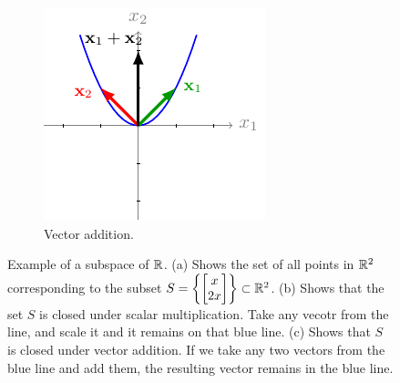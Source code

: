 \begin{figure}[h]
\begin{subfigure}[b]{0.32\textwidth}
    \end{subfigure}
    \begin{subfigure}[b]{0.32\textwidth}
        \centering
        \includegraphics{figure/chapter01/nosubspace2(c).pdf}
        \caption{Vector addition.}
        \label{fig:nosubspace2-addition}
    \end{subfigure}
    \caption{Example of a subspace of $\mathbb{R}$. (a) Shows the set of all points in $\mathbb{R}^2$ corresponding to the subset $S = \left\{ \bmxc x \\ 2 x\emx\right\} \subset \mb{R}^2$. (b) Shows that the set $S$ is closed under scalar multiplication. Take any vecotr from the line, and scale it and it remains on that blue line. (c) Shows that $S$ is closed under vector addition. If we take any two vectors from the blue line and add them, the resulting vector remains in the blue line.}
\end{figure}

